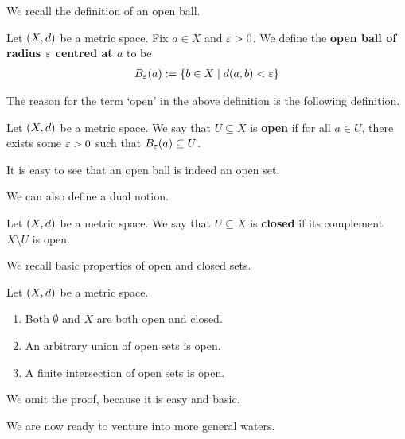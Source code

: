 We recall the definition of an open ball.

\begin{boxdefinition}
    Let $\left( X, d \right)$ be a metric space. Fix $a \in X$ and $\varepsilon > 0$. We define the \textbf{open ball of radius $\varepsilon$ centred at $a$} to be
    \begin{align*}
        B_{\varepsilon}\!\left( a \right) := \left\{ b \in X \; \middle\vert \; d\!\left( a, b \right) < \varepsilon \right\}
    \end{align*}
\end{boxdefinition}

The reason for the term `open' in the above definition is the following definition.

\begin{boxdefinition}\label{Ch1:Def:Open_Sets_Metric_Spaces}
    Let $\left( X, d \right)$ be a metric space. We say that $U \subseteq X$ is \textbf{open} if for all $a \in U$, there exists some $\varepsilon > 0$ such that $B_{\varepsilon}\!\left( a \right) \subseteq U$.
\end{boxdefinition}

It is easy to see that an open ball is indeed an open set.

We can also define a dual notion.

\begin{boxdefinition}
    Let $\left( X, d \right)$ be a metric space. We say that $U \subseteq X$ is \textbf{closed} if its complement $X \setminus U$ is open.
\end{boxdefinition}

We recall basic properties of open and closed sets.

\begin{boxproposition}\label{Ch1:Prop:Properties_of_Open_Sets}
    Let $\left( X, d \right)$ be a metric space.
    \begin{enumerate}
        \item Both $\emptyset$ and $X$ are both open and closed.
        \item An arbitrary union of open sets is open.
        \item A finite intersection of open sets is open.
    \end{enumerate}
\end{boxproposition}

We omit the proof, because it is easy and basic.

We are now ready to venture into more general waters.
